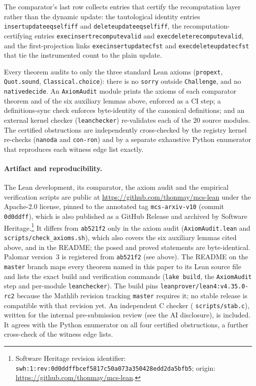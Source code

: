 \documentclass[11pt]{article}
\theoremstyle{definition}
\theoremstyle{remark}
\newcommand{\leanname}[1]{%
  \texttt{\begingroup\def\_{\textunderscore\allowbreak}#1\endgroup}}
\begin{document}
The comparator's last row collects entries that certify the recomputation layer
rather than the dynamic update: the tautological identity entries
\leanname{insert\_update\_eq\_self\_iff} and
\leanname{delete\_update\_eq\_self\_iff}, the recomputation-certifying entries
\leanname{exec\_insert\_recompute\_valid} and
\leanname{exec\_delete\_recompute\_valid}, and the first-projection links
\leanname{exec\_insert\_update\_c\_fst} and
\leanname{exec\_delete\_update\_c\_fst} that tie the instrumented count to the
plain update.

Every theorem audits to only the three standard Lean axioms (\texttt{propext},
\texttt{Quot.sound}, \texttt{Classical.choice}): there is no \texttt{sorry}
outside \leanname{Challenge}, and no \leanname{native\_decide}. An
\texttt{AxiomAudit} module prints the axioms of each comparator theorem and of
the six auxiliary lemmas above, enforced as a CI step; a definitions-sync check enforces byte-identity of the canonical
definitions; and an external kernel checker (\texttt{leanchecker}) re-validates
each of the $20$ source modules. The certified obstructions are independently cross-checked by the
registry kernel re-checks (\texttt{nanoda} and \texttt{con-ron}) and by a separate
exhaustive Python enumerator that reproduces each witness edge list exactly.

\paragraph{Artifact and reproducibility.} The Lean development, its comparator,
the axiom audit and the empirical verification scripts are public at
\url{https://github.com/thonmay/mcs-lean} under the Apache-2.0 license, pinned
to the annotated tag \leanname{mcs-arxiv-v10} (commit \texttt{0d0ddff}), which is
also published as a GitHub Release and archived by Software
Heritage.\footnote{Software Heritage revision identifier:\newline
\texttt{swh:1:rev:0d0ddffbcef5817c50a073a350428edd2da5bfb5};\newline
origin: \url{https://github.com/thonmay/mcs-lean}.} It differs from
\texttt{ab521f2} only in the axiom audit (\texttt{AxiomAudit.lean} and
\texttt{scripts/check\_axioms.sh}), which also covers the six auxiliary lemmas
cited above, and in the README; the posed and proved statements are
byte-identical. Palomar version~3 is registered from \texttt{ab521f2} (see
above). The README on the \texttt{master} branch maps every theorem
named in this paper to its Lean source file and lists the exact build and
verification commands (\texttt{lake build}, the \texttt{AxiomAudit} step and
per-module \texttt{leanchecker}). The build pins
\texttt{leanprover/lean4:v4.35.0-rc2} because the Mathlib revision tracking
\texttt{master} requires it; no stable release is compatible with that revision
yet. An independent C checker (\leanname{scripts/stab.c}), written for the
internal pre-submission review (see the AI disclosure), is included. It agrees with the Python enumerator on all four certified
obstructions, a further cross-check of the witness edge lists.
\end{document}
